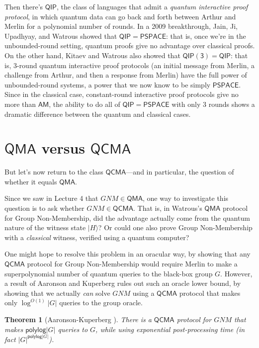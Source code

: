 \documentclass[11pt]{report}
\theoremstyle{plain}
\newtheorem{theorem}{Theorem}[section]
\theoremstyle{definition}
\renewcommand{\ket}[1]{|#1\rangle}
\begin{document}
Then there's $\mathsf{QIP}$, the class of languages that admit a {\em quantum interactive proof protocol}, in which quantum data can go back and forth between Arthur and Merlin for a polynomial number of rounds.  In a 2009 breakthrough, Jain, Ji, Upadhyay, and Watrous \cite{JJUW11} showed that $\mathsf{QIP}=\mathsf{PSPACE}$: that is, once we're in the unbounded-round setting, quantum proofs give no advantage over classical proofs.  On the other hand, Kitaev and Watrous \cite{kitaevwatrous} also showed that $\mathsf{QIP(3)}=\mathsf{QIP}$: that is, 3-round quantum interactive proof protocols (an initial message from Merlin, a challenge from Arthur, and then a response from Merlin) have the full power of unbounded-round systems, a power that we now know to be simply $\mathsf{PSPACE}$.  Since in the classical case, constant-round interactive proof protocols give no more than $\mathsf{AM}$, the ability to do all of $\mathsf{QIP}=\mathsf{PSPACE}$ with only $3$ rounds shows a dramatic difference between the quantum and classical cases.

\section{$\mathsf{QMA}$ versus $\mathsf{QCMA}$}

But let's now return to the class $\mathsf{QCMA}$---and in particular, the question of whether it equals $\mathsf{QMA}$.

Since we saw in Lecture 4 that $GNM \in \mathsf{QMA}$, one way to investigate this question is to ask whether $GNM \in \mathsf{QCMA}$.  That is, in Watrous's $\mathsf{QMA}$ protocol for Group Non-Membership, did the advantage actually come from the quantum nature of the witness state $\ket{H}$?  Or could one also prove Group Non-Membership with a {\em classical} witness, verified using a quantum computer?

One might hope to resolve this problem in an oracular way, by showing that any $\mathsf{QCMA}$ protocol for Group Non-Membership would require Merlin to make a superpolynomial number of quantum queries to the black-box group $G$.  However, a result of Aaronson and Kuperberg \cite{ak} rules out such an oracle lower bound, by showing that we actually {\em can} solve $GNM$ using a $\mathsf{QCMA}$ protocol that makes only $\log^{O(1)} |G|$ queries to the group oracle.

\begin{theorem} [Aaronson-Kuperberg \cite{ak}]
\label{akthm}
There is a $\mathsf{QCMA}$ protocol for $GNM$ that makes
  $\mathsf{polylog}| G |$ queries to $G$, while using exponential post-processing time (in fact  $| G |^{\mathsf{polylog} | G |}$).
\end{theorem}
\end{document}

